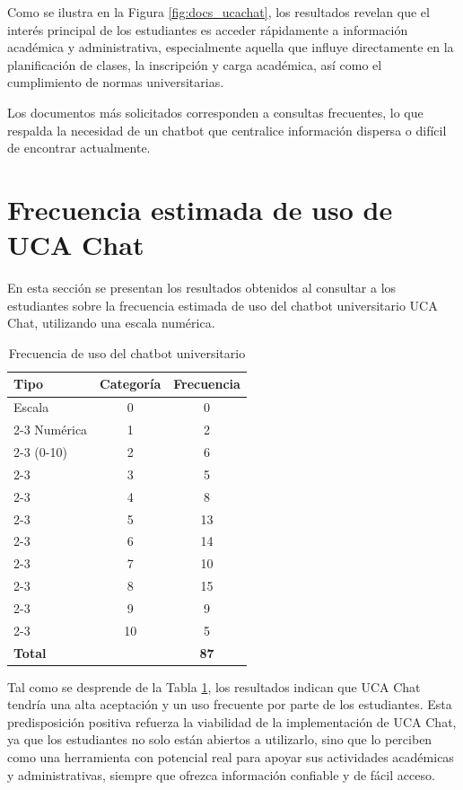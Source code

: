 {{Como se ilustra en la Figura \ref{fig:docs_ucachat}, los resultados revelan que el interés principal de los estudiantes es acceder rápidamente a información académica y administrativa, especialmente aquella que influye directamente en la planificación de clases, la inscripción y carga académica, así como el cumplimiento de normas universitarias. 
 
 Los documentos más solicitados corresponden a consultas frecuentes, lo que respalda la necesidad de un chatbot que centralice información dispersa o difícil de encontrar actualmente.


\section{Frecuencia estimada de uso de UCA Chat}

En esta sección se presentan los resultados obtenidos al consultar a los estudiantes sobre la frecuencia estimada de uso del chatbot universitario UCA Chat, utilizando una escala numérica.

\begin{table}[H]
    \centering
    \caption{Frecuencia de uso del chatbot universitario}
    \begin{tabular}{|l|c|c|}
        \hline
        \textbf{Tipo} & \textbf{Categoría} & \textbf{Frecuencia} \\ \hline
        Escala & 0 & 0 \\ \cline{2-3} 
        Numérica & 1 & 2 \\ \cline{2-3} 
        (0-10) & 2 & 6 \\ \cline{2-3} 
         & 3 & 5 \\ \cline{2-3} 
         & 4 & 8 \\ \cline{2-3} 
         & 5 & 13 \\ \cline{2-3} 
         & 6 & 14 \\ \cline{2-3} 
         & 7 & 10 \\ \cline{2-3} 
         & 8 & 15 \\ \cline{2-3} 
         & 9 & 9 \\ \cline{2-3} 
         & 10 & 5 \\ \hline
        \textbf{Total} & \multicolumn{1}{c|}{} & \textbf{87} \\ \hline
    \end{tabular}
    \label{tab:uso_ucachat}
\end{table}

Tal como se desprende de la Tabla \ref{tab:uso_ucachat}, los resultados indican que UCA Chat tendría una alta aceptación y un uso frecuente por parte de los estudiantes. Esta predisposición positiva refuerza la viabilidad de la implementación de UCA Chat, ya que los estudiantes no solo están abiertos a utilizarlo, sino que lo perciben como una herramienta con potencial real para apoyar sus actividades académicas y administrativas, siempre que ofrezca información confiable y de fácil acceso.

}}

